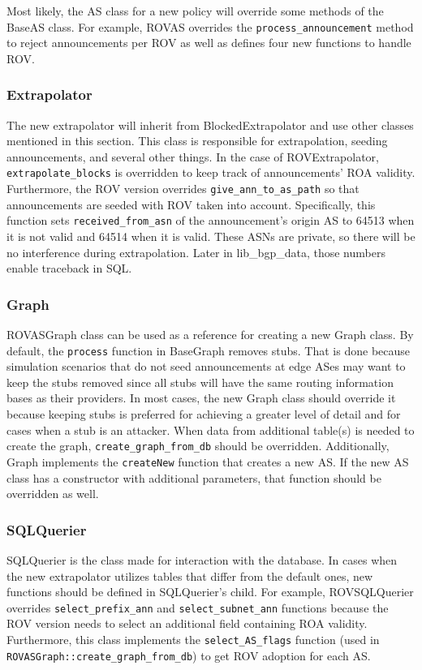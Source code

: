 \documentclass[letterpaper]{article}
\begin{document}
Most likely, the AS class for a new policy will override some methods of the
BaseAS class. For example, ROVAS overrides the \texttt{process\_announcement}
method to reject announcements per ROV as well as defines four new functions to
handle ROV.

\subsubsection*{Extrapolator}

The new extrapolator will inherit from BlockedExtrapolator and use other
classes mentioned in this section. This class is responsible for extrapolation,
seeding announcements, and several other things. In the case of
ROVExtrapolator, \texttt{extrapolate\_blocks} is overridden to keep track of
announcements' ROA validity. Furthermore, the ROV version overrides
\texttt{give\_ann\_to\_as\_path} so that announcements are seeded with ROV
taken into account. Specifically, this function sets
\texttt{received\_from\_asn} of the announcement's origin AS to 64513 when it
is not valid and 64514 when it is valid. These ASNs are private, so there will
be no interference during extrapolation. Later in lib\_bgp\_data, those numbers
enable traceback in SQL. 

\subsubsection*{Graph}

ROVASGraph class can be used as a reference for creating a new Graph class. By
default, the \texttt{process} function in BaseGraph removes stubs. That is done
because simulation scenarios that do not seed announcements at edge ASes may
want to keep the stubs removed since all stubs will have the same routing
information bases as their providers. In most cases, the new Graph class should
override it because keeping stubs is preferred for achieving a greater level of
detail and for cases when a stub is an attacker. When data from additional
table(s) is needed to create the graph, \texttt{create\_graph\_from\_db} should
be overridden. Additionally, Graph implements the \texttt{createNew} function
that creates a new AS. If the new AS class has a constructor with additional
parameters, that function should be overridden as well. 

\subsubsection*{SQLQuerier}

SQLQuerier is the class made for interaction with the database. In cases when
the new extrapolator utilizes tables that differ from the default ones, new
functions should be defined in SQLQuerier's child. For example, ROVSQLQuerier
overrides \texttt{select\_prefix\_ann} and \texttt{select\_subnet\_ann}
functions because the ROV version needs to select an additional field
containing ROA validity. Furthermore, this class implements the
\texttt{select\_AS\_flags} function (used in
\texttt{ROVASGraph::create\_graph\_from\_db}) to get ROV adoption for each AS.


\end{document}

